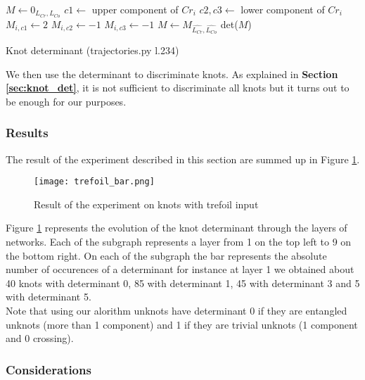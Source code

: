 \documentclass[12pt, a4paper]{article}
\begin{document}
\begin{algorithm}[H]
  \begin{algorithmic}[1]
    \ENDIF
    \STATE $M \gets 0_{L_{Cr},L_{Co}}$
    \STATE $c1 \gets$ upper component of $Cr_i$
    \STATE $c2,c3 \gets$ lower component of $Cr_i$
    \STATE $M_{i,c1} \gets 2$
    \STATE $M_{i,c2} \gets -1$
    \STATE $M_{i,c3} \gets -1$
    \ENDFOR
    \STATE $M \gets M_{\widehat{L_{Cr}}, \widehat{L_{Co}}}$
    \RETURN det($M$)
  \end{algorithmic}
  \caption{Knot determinant ({\selectfont trajectories.py l.234})}
  \label{alg:knot_det}
\end{algorithm}

We then use the determinant to discriminate knots. As explained in \textbf{Section \ref{sec:knot_det}}, it is not sufficient to discriminate all knots but it turns out to be enough for our purposes. 

\subsubsection{Results}

The result of the experiment described in this section are summed up in Figure \ref{fig:knot_results}.

\begin{figure}[H]
  \centering
  \texttt{[image: trefoil\_bar.png]}
  \caption{Result of the experiment on knots with trefoil input}
  \label{fig:knot_results}
\end{figure}

Figure \ref{fig:knot_results} represents the evolution of the knot determinant through the layers of networks. Each of the subgraph represents a layer from 1 on the top left to 9 on the bottom right. On each of the subgraph the bar represents the absolute number of occurences of a determinant for instance at layer 1 we obtained about 40 knots with determinant 0, 85 with determinant 1, 45 with determinant 3 and 5 with determinant 5.\\

Note that using our alorithm unknots have determinant 0 if they are entangled unknots (more than 1 component) and 1 if they are trivial unknots (1 component and 0 crossing).

\subsubsection{Considerations}
\end{document}
